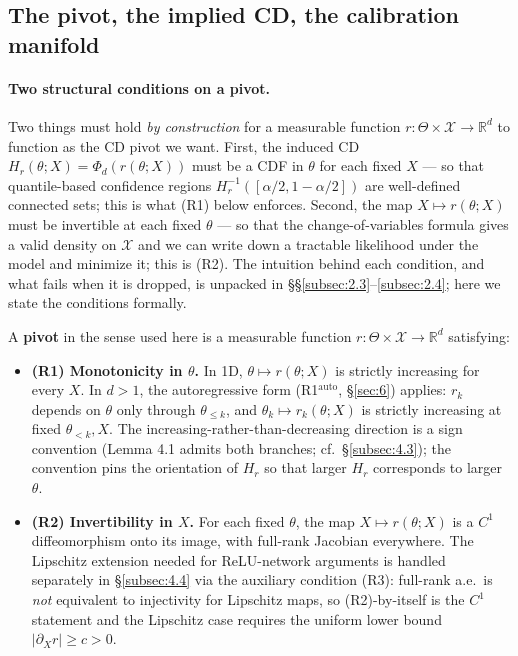 \documentclass[11pt]{article}
\providecommand{\tightlist}{\setlength{\itemsep}{0pt}\setlength{\parskip}{0pt}}
\begin{document}
\subsection{The pivot, the implied CD, the calibration manifold}\label{subsec:2.2}

\paragraph{Two structural conditions on a pivot.}
Two things must hold \emph{by construction} for a measurable function
\(r: \Theta \times \mathcal{X} \to \mathbb{R}^d\) to function as the
CD pivot we want. First, the induced CD
\(H_r(\theta; X) = \Phi_d(r(\theta; X))\) must be a CDF in \(\theta\)
for each fixed \(X\) --- so that quantile-based confidence regions
\(H_r^{-1}([\alpha/2, 1-\alpha/2])\) are well-defined connected sets;
this is what (R1) below enforces. Second, the map
\(X \mapsto r(\theta; X)\) must be invertible at each fixed \(\theta\)
--- so that the change-of-variables formula gives a valid density on
\(\mathcal{X}\) and we can write down a tractable likelihood under the
model and minimize it; this is (R2). The intuition behind each
condition, and what fails when it is dropped, is unpacked in
§§\ref{subsec:2.3}--\ref{subsec:2.4}; here we state the conditions
formally.

A \textbf{pivot} in the sense used here is a measurable function
\(r: \Theta \times \mathcal{X} \to \mathbb{R}^d\) satisfying:

\begin{itemize}
\tightlist
\item
  \textbf{(R1) Monotonicity in \(\theta\).} In 1D,
  \(\theta \mapsto r(\theta; X)\) is strictly increasing for every
  \(X\). In \(d > 1\), the autoregressive form
  (R1\(^\mathrm{auto}\), \S\ref{sec:6}) applies: \(r_k\) depends on
  \(\theta\) only through \(\theta_{\le k}\), and
  \(\theta_k \mapsto r_k(\theta; X)\) is strictly increasing at fixed
  \(\theta_{<k}, X\). The increasing-rather-than-decreasing direction is
  a sign convention (Lemma 4.1 admits both branches; cf.~\S\ref{subsec:4.3});
  the convention pins the orientation of \(H_r\) so that larger \(H_r\)
  corresponds to larger \(\theta\).
\item
  \textbf{(R2) Invertibility in \(X\).} For each fixed \(\theta\), the
  map \(X \mapsto r(\theta; X)\) is a \(C^1\) diffeomorphism onto its
  image, with full-rank Jacobian everywhere. The Lipschitz extension
  needed for ReLU-network arguments is handled separately in
  \S\ref{subsec:4.4} via the auxiliary condition (R3): full-rank a.e.\ is
  \emph{not} equivalent to injectivity for Lipschitz maps, so
  (R2)-by-itself is the \(C^1\) statement and the Lipschitz case requires
  the uniform lower bound \(|\partial_X r| \ge c > 0\).
\end{itemize}
\end{document}
